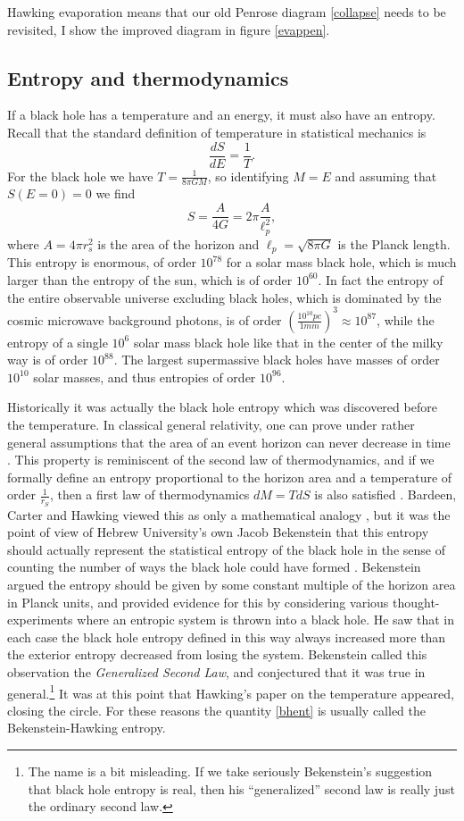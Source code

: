 \documentclass[12pt]{article}
\newcommand{\be}{\begin{equation}}
\newcommand{\ee}{\end{equation}}
\begin{document}
Hawking evaporation means that our old Penrose diagram \ref{collapse} needs to be revisited, I show the improved diagram in figure \ref{evappen}.


\subsection{Entropy and thermodynamics}\label{entsec}
If a black hole has a temperature and an energy, it must also have an entropy.  Recall that the standard definition of temperature in statistical mechanics is
\be
\frac{dS}{dE}=\frac{1}{T}.  
\ee
For the black hole we have $T=\frac{1}{8\pi G M}$, so identifying $M=E$ and assuming that $S(E=0)=0$ we find
\be\label{bhent}
S=\frac{A}{4G}=2\pi \frac{A}{\ell_p^2},
\ee
where $A=4\pi r_s^2$ is the area of the horizon and $\ell_p=\sqrt{8\pi G}$ is the Planck length.  This entropy is enormous, of order $10^{78}$ for a solar mass black hole, which is much larger than the entropy of the sun, which is of order $10^{60}$.  In fact the entropy of the entire observable universe excluding black holes, which is dominated by the cosmic microwave background photons, is of order $\left(\frac{10^{10} pc}{1mm}\right)^3\approx 10^{87}$, while the entropy of a single $10^{6}$ solar mass black hole like that in the center of the milky way is of order $10^{88}$.  The largest supermassive black holes have masses of order $10^{10}$ solar masses, and thus entropies of order $10^{96}$.

Historically it was actually the black hole entropy which was discovered before the temperature. In classical general relativity, one can prove under rather general assumptions that the area of an event horizon can never decrease in time \cite{Hawking:1971tu}.  This property is reminiscent of the second law of thermodynamics, and if we formally define an entropy proportional to the horizon area and a temperature of order $\frac{1}{r_S}$, then a first law of thermodynamics $dM=TdS$ is also satisfied \cite{Bekenstein:1973ur,Bardeen:1973gs}.  Bardeen, Carter and Hawking viewed this as only a mathematical analogy \cite{Bardeen:1973gs}, but it was the point of view of Hebrew University's own Jacob Bekenstein that this entropy should actually represent the statistical entropy of the black hole in the sense of counting the number of ways the black hole could have formed \cite{Bekenstein:1973ur,Bekenstein:1974ax}.  Bekenstein argued the entropy should be given by some constant multiple of the horizon area in Planck units, and provided evidence for this by considering various thought-experiments where an entropic system is thrown into a black hole.  He saw that in each case the black hole entropy defined in this way always increased more than the exterior entropy decreased from losing the system.  Bekenstein called this observation the \textit{Generalized Second Law}, and conjectured that it was true in general.\footnote{The name is a bit misleading.  If we take seriously Bekenstein's suggestion that black hole entropy is real, then his ``generalized'' second law is really just the ordinary second law.}  It was at this point that Hawking's paper on the temperature appeared, closing the circle.  For these reasons the quantity \eqref{bhent} is usually called the Bekenstein-Hawking entropy.
\end{document}
